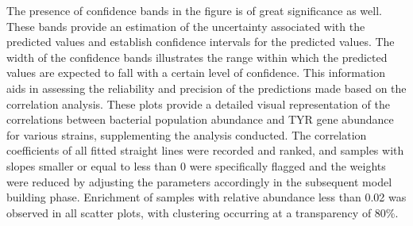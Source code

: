 \documentclass[12pt]{article}
\begin{document}
The presence of confidence bands in the figure is of great significance as well. These bands provide an estimation of the uncertainty associated with the predicted values and establish confidence intervals for the predicted values. The width of the confidence bands illustrates the range within which the predicted values are expected to fall with a certain level of confidence. This information aids in assessing the reliability and precision of the predictions made based on the correlation analysis. These plots provide a detailed visual representation of the correlations between bacterial population abundance and TYR gene abundance for various strains, supplementing the analysis conducted. The correlation coefficients of all fitted straight lines were recorded and ranked, and samples with slopes smaller or equal to less than 0 were specifically flagged and the weights were reduced by adjusting the parameters accordingly in the subsequent model building phase. Enrichment of samples with relative abundance less than 0.02 was observed in all scatter plots, with clustering occurring at a transparency of 80\%.
\end{document}
